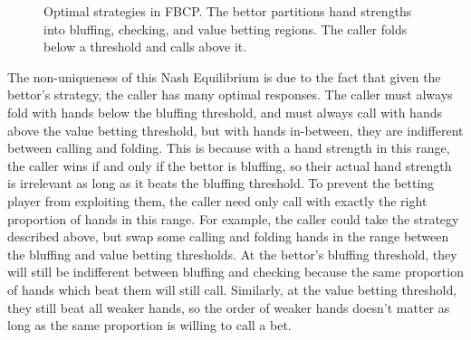 \documentclass[../../main/main.tex]{subfiles}
\begin{document}
\begin{figure}[h]
    \caption{Optimal strategies in FBCP. The bettor partitions hand strengths into bluffing, checking, and value betting regions. The caller folds below a threshold and calls above it.}
    \label{fig:fbcp_strategy}
\end{figure}

The non-uniqueness of this Nash Equilibrium is due to the fact that given the bettor's strategy, the caller has many optimal responses. The caller must always fold with hands below the bluffing threshold, and must always call with hands above the value betting threshold, but with hands in-between, they are indifferent between calling and folding. This is because with a hand strength in this range, the caller wins if and only if the bettor is bluffing, so their actual hand strength is irrelevant as long as it beats the bluffing threshold. To prevent the betting player from exploiting them, the caller need only call with exactly the right proportion of hands in this range. For example, the caller could take the strategy described above, but swap some calling and folding hands in the range between the bluffing and value betting thresholds. At the bettor's bluffing threshold, they will still be indifferent between bluffing and checking because the same proportion of hands which beat them will still call. Similarly, at the value betting threshold, they still beat all weaker hands, so the order of weaker hands doesn't matter as long as the same proportion is willing to call a bet.
\end{document}
